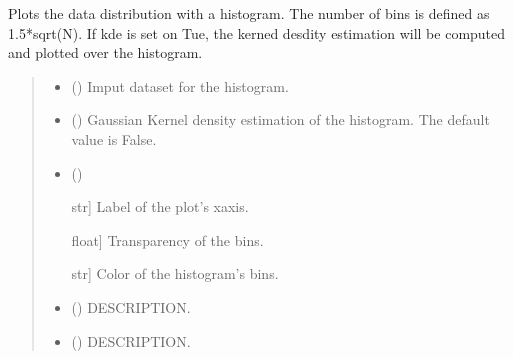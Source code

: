 \documentclass[letterpaper,10pt,english]{sphinxmanual}
\begin{document}
\begin{fulllineitems}
\label{\detokenize{plots:ggcas.plots.histogram}}
\pysigstartsignatures
{}
\pysigstopsignatures
\sphinxAtStartPar
Plots the data distribution with a histogram. The number of bins is defined as 1.5*sqrt(N). If kde is set on Tue, the kerned desdity estimation will be computed and plotted over the histogram.
\begin{quote}\begin{description}
\begin{itemize}
\item {} 
\sphinxAtStartPar
{} () \textendash{} Imput dataset for the histogram.

\item {} 
\sphinxAtStartPar
{} () \textendash{} Gaussian Kernel density estimation of the histogram. The default value is False.

\item {} 
\sphinxAtStartPar
{} () \textendash{} \begin{description}
\sphinxlineitem{xlabel}{[}str{]}
\sphinxAtStartPar
Label of the plot’s x\sphinxhyphen{}axis.

\sphinxlineitem{alpha}{[}float{]}
\sphinxAtStartPar
Transparency of the bins.

\sphinxlineitem{color}{[}str{]}
\sphinxAtStartPar
Color of the histogram’s bins.

\end{description}


\end{itemize}

\sphinxAtStartPar
\begin{itemize}
\item {} 
\sphinxAtStartPar
{} () \textendash{} DESCRIPTION.

\item {} 
\sphinxAtStartPar
{} () \textendash{} DESCRIPTION.

\end{itemize}


\end{description}\end{quote}

\end{fulllineitems}
\end{document}
